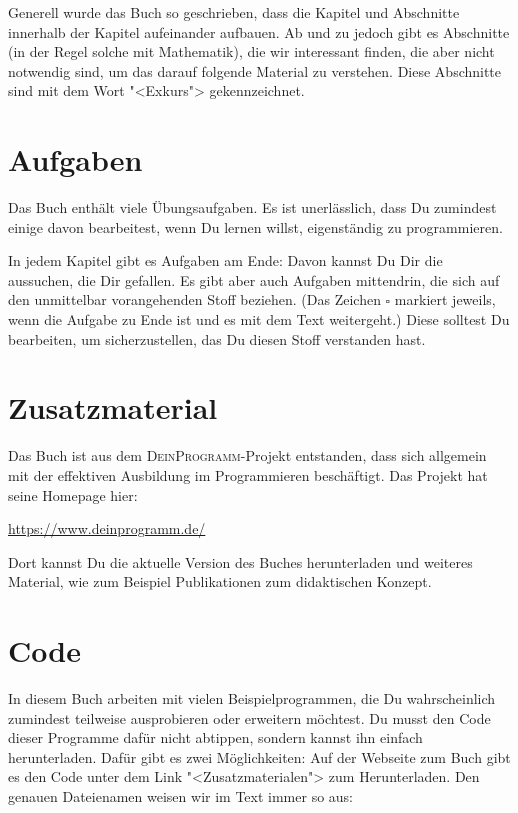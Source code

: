 Generell wurde das Buch so geschrieben, dass die Kapitel und
Abschnitte innerhalb der Kapitel aufeinander aufbauen.  Ab und zu
jedoch gibt es Abschnitte (in der Regel solche mit Mathematik), die
wir interessant finden, die aber nicht notwendig sind, um das darauf
folgende Material zu verstehen.  Diese Abschnitte sind mit dem Wort
"<Exkurs"> gekennzeichnet.

\section{Aufgaben}

Das Buch enthält viele Übungsaufgaben.  Es ist unerlässlich, dass Du
zumindest einige davon bearbeitest, wenn Du lernen willst,
eigenständig zu programmieren.

In jedem Kapitel gibt es Aufgaben am Ende: Davon kannst Du Dir die
aussuchen, die Dir gefallen.  Es gibt aber auch Aufgaben mittendrin,
die sich auf den unmittelbar vorangehenden Stoff beziehen.  (Das
Zeichen \(\square\) markiert jeweils, wenn die Aufgabe zu Ende ist und es
mit dem Text weitergeht.)  Diese
solltest Du bearbeiten, um sicherzustellen, das Du diesen Stoff
verstanden hast.

\section{Zusatzmaterial}

Das Buch ist aus dem \textsc{DeinProgramm}-Projekt entstanden, dass
sich allgemein mit der effektiven Ausbildung im Programmieren
beschäftigt.  Das Projekt hat seine Homepage hier:
%
\begin{center}
  \url{https://www.deinprogramm.de/}
\end{center}
%
Dort kannst Du die aktuelle Version des Buches herunterladen und
weiteres Material, wie zum Beispiel Publikationen zum didaktischen
Konzept.

\section{Code}

In diesem Buch arbeiten mit vielen Beispielprogrammen, die Du
wahrscheinlich zumindest teilweise ausprobieren oder erweitern
möchtest.  Du musst den Code dieser Programme dafür nicht abtippen,
sondern kannst ihn einfach herunterladen.  Dafür gibt es zwei
Möglichkeiten: Auf der Webseite zum Buch gibt es den Code unter dem
Link "<Zusatzmaterialen"> zum Herunterladen.  Den genauen Dateienamen
weisen wir im Text immer so aus:

